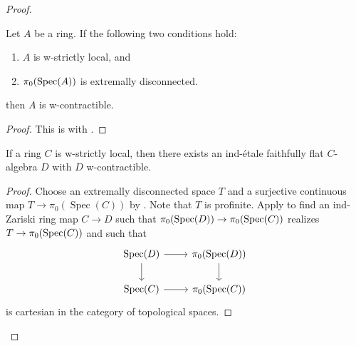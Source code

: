 \begin{proof}
\begin{proposition} %
  \label{thm:w-contractible-if}
  Let $A$ be a ring. If the following two conditions hold:
  \begin{enumerate}
    \item $A$ is w-strictly local, and
    \item $\pi_0(\operatorname{Spec} (A))$ is extremally disconnected.
  \end{enumerate}
  then $A$ is w-contractible.
\end{proposition}

\begin{proof}
  This is  with .
\end{proof}

\begin{lemma}
  If a ring \(C\) is w-strictly local, then there exists an ind-étale faithfully flat \(C\)-algebra \(D\) with \(D\) w-contractible.
  \label{thm:ind-etale-w-contractible-cover-of-w-strictly-local}
\end{lemma}

\begin{proof}
  Choose an extremally disconnected space $T$ and a surjective continuous map $T \to \pi_0(\operatorname{Spec}(C))$ by . Note that $T$ is profinite.
  Apply  to find an ind-Zariski ring map $C \to D$ such that $\pi_0(\operatorname{Spec} (D)) \to \pi_0(\operatorname{Spec} (C))$ realizes $T \to \pi_0(\operatorname{Spec} (C))$ and such that
  \[
  \begin{tikzcd}
  \operatorname{Spec}(D) \arrow[r] \arrow[d] & \pi_0(\operatorname{Spec}(D)) \arrow[d] \\
  \operatorname{Spec}(C) \arrow[r] & \pi_0(\operatorname{Spec}(C))
  \end{tikzcd}
  \]
  is cartesian in the category of topological spaces.


\end{proof}
\end{proof}
